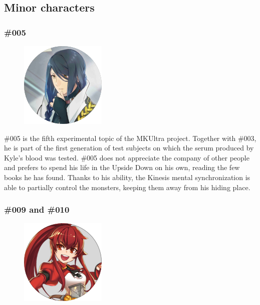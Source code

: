 \begin{center}
\end{center}

\newpage

\subsection{Minor characters}

\subsubsection{\#005}

\begin{figure}
	\centering
	\includegraphics[width=0.55\linewidth]{images/characters/005.png}
\end{figure}

\#005 is the fifth experimental topic of the MKUltra project. Together with \#003, he is part of the first generation of test subjects on which the serum produced by Kyle's blood was tested. \#005 does not appreciate the company of other people and prefers to spend his life in the Upside Down on his own, reading the few books he has found. Thanks to his ability, the Kinesis mental synchronization is able to partially control the monsters, keeping them away from his hiding place.\\


\subsubsection{\#009 and \#010}

\begin{figure}
	\centering
	\includegraphics[width=0.5\linewidth]{images/characters/009.png}
\end{figure}

